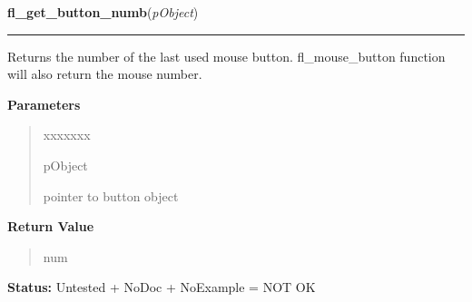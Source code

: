\hspace{.8\funcindent}\begin{boxedminipage}{\funcwidth}

    \raggedright \textbf{fl\_get\_button\_numb}(\textit{pObject})

    \vspace{-1.5ex}

    \rule{\textwidth}{0.5\fboxrule}
\setlength{\parskip}{2ex}
    Returns the number of the last used mouse button. fl\_mouse\_button 
    function will also return the mouse number.

\setlength{\parskip}{1ex}
      \textbf{Parameters}
      \vspace{-1ex}

      \begin{quote}
        \begin{Ventry}{xxxxxxx}

          \item[pObject]

          pointer to button object

        \end{Ventry}

      \end{quote}

      \textbf{Return Value}
    \vspace{-1ex}

      \begin{quote}
      num

      \end{quote}

\textbf{Status:} Untested + NoDoc + NoExample = NOT OK



    \end{boxedminipage}

    \label{xformslib:library:fl_set_object_shortcut}

    \vspace{0.5ex}

